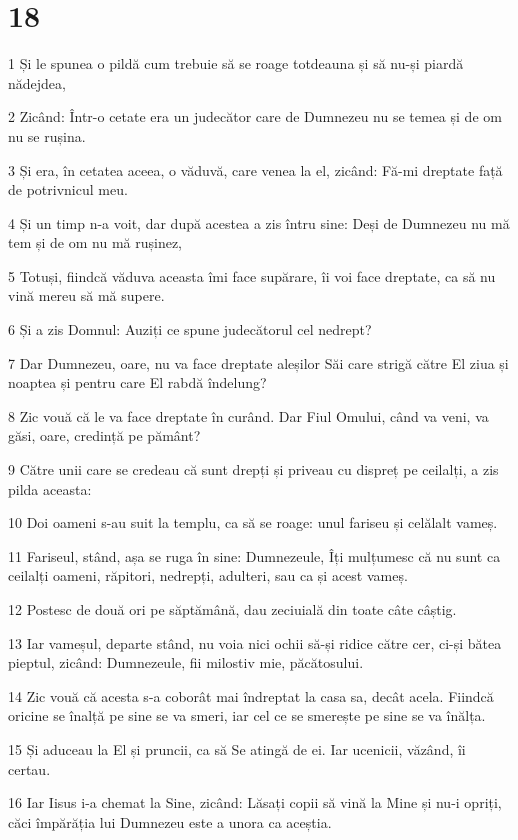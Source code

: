\chapter{18}

\par 1 Și le spunea o pildă cum trebuie să se roage totdeauna și să nu-și piardă nădejdea,
\par 2 Zicând: Într-o cetate era un judecător care de Dumnezeu nu se temea și de om nu se rușina.
\par 3 Și era, în cetatea aceea, o văduvă, care venea la el, zicând: Fă-mi dreptate față de potrivnicul meu.
\par 4 Și un timp n-a voit, dar după acestea a zis întru sine: Deși de Dumnezeu nu mă tem și de om nu mă rușinez,
\par 5 Totuși, fiindcă văduva aceasta îmi face supărare, îi voi face dreptate, ca să nu vină mereu să mă supere.
\par 6 Și a zis Domnul: Auziți ce spune judecătorul cel nedrept?
\par 7 Dar Dumnezeu, oare, nu va face dreptate aleșilor Săi care strigă către El ziua și noaptea și pentru care El rabdă îndelung?
\par 8 Zic vouă că le va face dreptate în curând. Dar Fiul Omului, când va veni, va găsi, oare, credință pe pământ?
\par 9 Către unii care se credeau că sunt drepți și priveau cu dispreț pe ceilalți, a zis pilda aceasta:
\par 10 Doi oameni s-au suit la templu, ca să se roage: unul fariseu și celălalt vameș.
\par 11 Fariseul, stând, așa se ruga în sine: Dumnezeule, Îți mulțumesc că nu sunt ca ceilalți oameni, răpitori, nedrepți, adulteri, sau ca și acest vameș.
\par 12 Postesc de două ori pe săptămână, dau zeciuială din toate câte câștig.
\par 13 Iar vameșul, departe stând, nu voia nici ochii să-și ridice către cer, ci-și bătea pieptul, zicând: Dumnezeule, fii milostiv mie, păcătosului.
\par 14 Zic vouă că acesta s-a coborât mai îndreptat la casa sa, decât acela. Fiindcă oricine se înalță pe sine se va smeri, iar cel ce se smerește pe sine se va înălța.
\par 15 Și aduceau la El și pruncii, ca să Se atingă de ei. Iar ucenicii, văzând, îi certau.
\par 16 Iar Iisus i-a chemat la Sine, zicând: Lăsați copii să vină la Mine și nu-i opriți, căci împărăția lui Dumnezeu este a unora ca aceștia.
